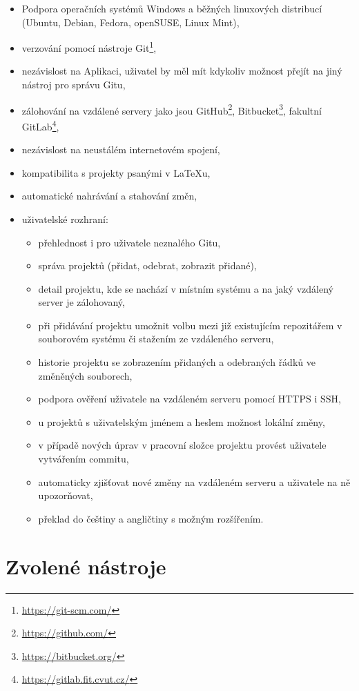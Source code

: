 \begin{itemize}
	\item Podpora operačních systémů Windows a běžných linuxových distribucí (Ubuntu, Debian, Fedora, openSUSE, Linux Mint),
	\item verzování pomocí nástroje Git\footnote{\url{https://git-scm.com/}},
	\item nezávislost na Aplikaci, uživatel by měl mít kdykoliv možnost přejít na jiný nástroj pro správu Gitu,
	\item zálohování na vzdálené servery jako jsou GitHub\footnote{\url{https://github.com/}}, Bitbucket\footnote{\url{https://bitbucket.org/}}, fakultní GitLab\footnote{\url{https://gitlab.fit.cvut.cz/}},
	\item nezávislost na neustálém internetovém spojení,
	\item kompatibilita s projekty psanými v \LaTeX{u},
	\item automatické nahrávání a stahování změn,
	\item uživatelské rozhraní:
		\begin{itemize}
			\item přehlednost i pro uživatele neznalého Gitu,
			\item správa projektů (přidat, odebrat, zobrazit přidané),
			\item detail projektu, kde se nachází v místním systému a na jaký vzdálený server je zálohovaný,
			\item při přidávání projektu umožnit volbu mezi již existujícím repozitářem v souborovém systému či stažením ze vzdáleného serveru,
			\item historie projektu se zobrazením přidaných a odebraných řádků ve změněných souborech,
			\item podpora ověření uživatele na vzdáleném serveru pomocí HTTPS i SSH,
			\item u projektů s uživatelským jménem a heslem možnost lokální změny,
			\item v případě nových úprav v pracovní složce projektu provést uživatele vytvářením commitu,
			\item automaticky zjišťovat nové změny na vzdáleném serveru a uživatele na ně upozorňovat,
			\item překlad do češtiny a angličtiny s možným rozšířením.
		\end{itemize}
\end{itemize}


\section{Zvolené nástroje}

